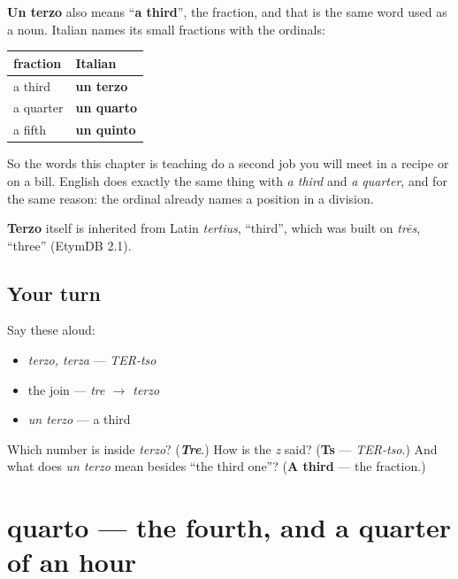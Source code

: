 \begin{cousinweb}
\textbf{Un terzo} also means \textquotedblleft{}\textbf{a third}\textquotedblright{}, the fraction, and that is the same word used as a noun. Italian names its small fractions with the ordinals:

\noindent
\begin{tabularx}{\linewidth}{@{}>{\raggedright\arraybackslash}X>{\raggedright\arraybackslash}X@{}}
\toprule
\textbf{fraction} & \textbf{Italian} \\
\midrule
a third & \textbf{un terzo} \\
a quarter & \textbf{un quarto} \\
a fifth & \textbf{un quinto} \\
\bottomrule
\end{tabularx}

So the words this chapter is teaching do a second job you will meet in a recipe or on a bill. English does exactly the same thing with \emph{a third} and \emph{a quarter}, and for the same reason: the ordinal already names a position in a division.

\textbf{Terzo} itself is inherited from Latin \emph{tertius}, \textquotedblleft{}third\textquotedblright{}, which was built on \emph{trēs}, \textquotedblleft{}three\textquotedblright{} (EtymDB 2.1).
\end{cousinweb}

\subsection*{Your turn}
Say these aloud:

\begin{itemize}
\raggedright
  \item \emph{terzo, terza} — \emph{TER-tso}
  \item the join — \emph{tre $\to$ terzo}
  \item \emph{un terzo} — a third
\end{itemize}

\begin{tcolorbox}[breakable,colback=teal!4,colframe=teal!35!black,title={Before you move on}]
Which number is inside \emph{terzo}? (\emph{\textbf{Tre}}.) How is the \emph{z} said? (\textbf{Ts} — \emph{TER-tso}.) And what does \emph{un terzo} mean besides \textquotedblleft{}the third one\textquotedblright{}? (\textbf{A third} — the fraction.)
\end{tcolorbox}
\section[quarto / quarta]{quarto — the fourth, and a quarter of an hour}

